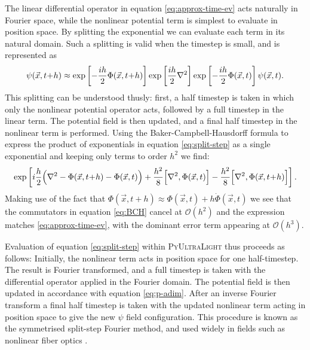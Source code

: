 \documentclass[a4paper,11pt]{article}
\newcommand{\PyUltraLight}{\textsc{PyUltraLight}\xspace}
\begin{document}
The linear differential operator in equation \ref{eq:approx-time-ev} acts naturally in Fourier space, while the nonlinear potential term is simplest to evaluate in position space. By splitting the exponential we can evaluate each term in its natural domain. Such a splitting is valid when the timestep is small, and is represented as
%
\begin{equation}\label{eq:split-step}
    \psi(\vec{x},t\hspace*{-.2em}+\hspace*{-.2em}h)\approx\operatorname{exp}\left[-\frac{ih}{2}\Phi(\vec{x},t\hspace*{-.2em}+\hspace*{-.2em}h)\right]\operatorname{exp}\left[\frac{ih}{2}\nabla^2\right]\operatorname{exp}\left[-\frac{ih}{2}\Phi(\vec{x},t)\right]\psi(\vec{x},t).
\end{equation}
%
This splitting can be understood thusly: first, a half timestep is taken in which only the nonlinear potential operator acts, followed by a full timestep in the linear term. The potential field is then updated, and a final half timestep in the nonlinear term is performed. Using the Baker-Campbell-Hausdorff formula to express the product of exponentials in equation \ref{eq:split-step} as a single exponential and keeping only terms to order $h^2$ we find:
\begin{equation}\label{eq:BCH}
    \operatorname{exp}\left[i\frac{h}{2}\Big(\nabla^2-\Phi(\vec{x},t\hspace*{-.2em}+\hspace*{-.2em}h)-\Phi(\vec{x},t)\Big)+\frac{h^2}{8}\Big[\nabla^2,\Phi(\vec{x},t)\Big]-\frac{h^2}{8}\Big[\nabla^2,\Phi(\vec{x},t\hspace*{-.2em}+\hspace*{-.2em}h)\Big]\right].
\end{equation}
Making use of the fact that $\Phi(\vec{x},t+h)\approx\Phi(\vec{x},t)+h\Dot{\Phi}(\vec{x},t)$ we see that the commutators in equation \ref{eq:BCH} cancel at $\mathcal{O}(h^2)$ and the expression matches \ref{eq:approx-time-ev}, with the dominant error term appearing at $\mathcal{O}(h^3)$. 

Evaluation of equation \ref{eq:split-step} within \PyUltraLight thus proceeds as follows:
Initially, the nonlinear term acts in position space for one half-timestep. The result is  Fourier transformed, and a full timestep is taken with the differential operator  applied in the Fourier domain. The potential field is then updated in accordance with equation \ref{eq:p-adim}. After an inverse Fourier transform a final half timestep is taken with the updated nonlinear term acting in position space to give the new $\psi$ field configuration. This procedure is known as the symmetrised split-step Fourier method, and  used widely in fields such as nonlinear fiber optics \cite{Agrawal2013, Zhang:2008, Sinkin2003}. 
\end{document}
